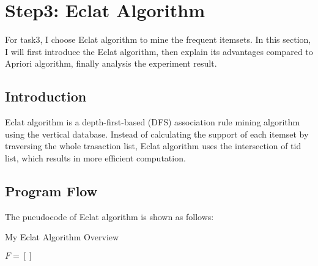 \documentclass[a4paper, oneside, final, 12pt]{scrartcl} %
\begin{document}
\endgroup

\section{Step3: Eclat Algorithm}

\begingroup
\raggedright

For task3, I choose Eclat algorithm to mine the frequent itemsets.
In this section, I will first introduce the Eclat algorithm,
then explain its advantages compared to Apriori algorithm,
finally analysis the experiment result.

\subsection{Introduction}

Eclat algorithm\cite{zaki1997new}\cite{7506659}\cite{borgelt2012frequent}\cite{goethals2003survey} 
is a depth-first-based (DFS) association rule mining algorithm 
using the vertical database. Instead of calculating the support of each itemset by
traversing the whole trasaction list, Eclat algorithm uses the intersection of tid list,
which results in more efficient computation. \\

\subsection{Program Flow}

The pueudocode of Eclat algorithm is shown as follows:

\begin{algorithm}
  \caption{My Eclat Algorithm Overview}

  \BlankLine
  $F = []$ \\
\end{algorithm}
\end{document}
